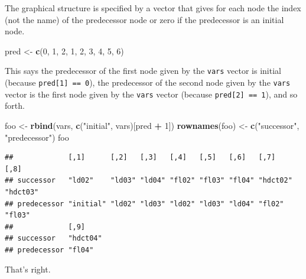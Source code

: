 \documentclass[
  ignorenonframetext,
]{beamer}
\newenvironment{Shaded}{\begin{snugshade}}{\end{snugshade}}
\newcommand{\DecValTok}[1]{\textcolor[rgb]{0.00,0.00,0.81}{#1}}
\newcommand{\FunctionTok}[1]{\textcolor[rgb]{0.13,0.29,0.53}{\textbf{#1}}}
\newcommand{\NormalTok}[1]{#1}
\newcommand{\OtherTok}[1]{\textcolor[rgb]{0.56,0.35,0.01}{#1}}
\newcommand{\SpecialCharTok}[1]{\textcolor[rgb]{0.81,0.36,0.00}{\textbf{#1}}}
\newcommand{\StringTok}[1]{\textcolor[rgb]{0.31,0.60,0.02}{#1}}
\begin{document}
\begin{frame}[fragile]{}
\protect\hypertarget{section-9}{}
The graphical structure is specified by a vector that gives for each
node the index (not the name) of the predecessor node or zero if the
predecessor is an initial node.

\vspace{12pt}

\begin{Shaded}
\begin{Highlighting}[]
\NormalTok{pred }\OtherTok{\textless{}{-}} \FunctionTok{c}\NormalTok{(}\DecValTok{0}\NormalTok{, }\DecValTok{1}\NormalTok{, }\DecValTok{2}\NormalTok{, }\DecValTok{1}\NormalTok{, }\DecValTok{2}\NormalTok{, }\DecValTok{3}\NormalTok{, }\DecValTok{4}\NormalTok{, }\DecValTok{5}\NormalTok{, }\DecValTok{6}\NormalTok{)}
\end{Highlighting}
\end{Shaded}

\vspace{12pt}

This says the predecessor of the first node given by the \texttt{vars}
vector is initial (because \texttt{pred[1] == 0}), the predecessor of
the second node given by the \texttt{vars} vector is the first node
given by the \texttt{vars} vector (because \texttt{pred[2] == 1}), and
so forth.
\end{frame}

\begin{frame}[fragile]{}
\protect\hypertarget{section-10}{}
\tiny

\begin{Shaded}
\begin{Highlighting}[]
\NormalTok{foo }\OtherTok{\textless{}{-}} \FunctionTok{rbind}\NormalTok{(vars, }\FunctionTok{c}\NormalTok{(}\StringTok{"initial"}\NormalTok{, vars)[pred }\SpecialCharTok{+} \DecValTok{1}\NormalTok{]) }
\FunctionTok{rownames}\NormalTok{(foo) }\OtherTok{\textless{}{-}} \FunctionTok{c}\NormalTok{(}\StringTok{"successor"}\NormalTok{, }\StringTok{"predecessor"}\NormalTok{)}
\NormalTok{foo}
\end{Highlighting}
\end{Shaded}

\begin{verbatim}
##             [,1]      [,2]   [,3]   [,4]   [,5]   [,6]   [,7]     [,8]    
## successor   "ld02"    "ld03" "ld04" "fl02" "fl03" "fl04" "hdct02" "hdct03"
## predecessor "initial" "ld02" "ld03" "ld02" "ld03" "ld04" "fl02"   "fl03"  
##             [,9]    
## successor   "hdct04"
## predecessor "fl04"
\end{verbatim}

\vspace{12pt}
\normalsize

That's right.
\end{frame}
\end{document}

